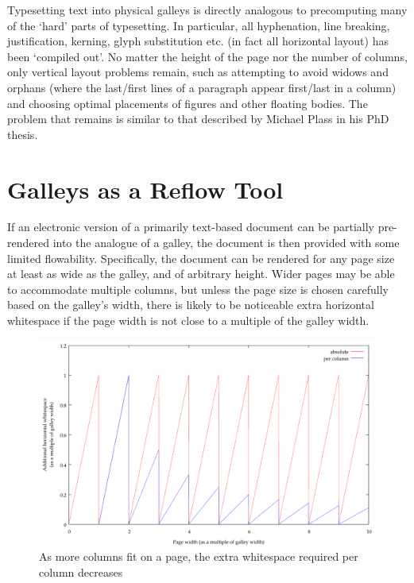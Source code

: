 Typesetting text into physical galleys is directly analogous to precomputing many of the `hard' parts of typesetting. In particular, all hyphenation, line breaking, justification, kerning, glyph substitution etc. (in fact all horizontal layout) has been `compiled out'. No matter the height of the page nor the number of columns, only vertical layout problems remain, such as attempting to avoid widows and orphans (where the last/first lines of a paragraph appear first/last in a column) and choosing optimal placements of figures and other floating bodies. The problem that remains is similar to that described by Michael Plass in his PhD thesis\cite{Plass1981}.

\section{Galleys as a Reflow Tool}
If an electronic version of a primarily text-based document can be partially pre-rendered into the analogue of a galley, the document is then provided with some limited flowability. Specifically, the document can be rendered for any page size at least as wide as the galley, and of arbitrary height. Wider pages may be able to accommodate multiple columns, but unless the page size is chosen carefully based on the galley's width, there is likely to be noticeable extra horizontal whitespace if the page width is not close to a multiple of the galley width.

\begin{figure}
 \includegraphics[width=\textwidth]{gnuplot/1col}
 \caption[Extra whitespace in a single-galley document]{As more columns fit on a page, the extra whitespace required per column decreases}
 \label{fig:sawtooth}
\end{figure}


